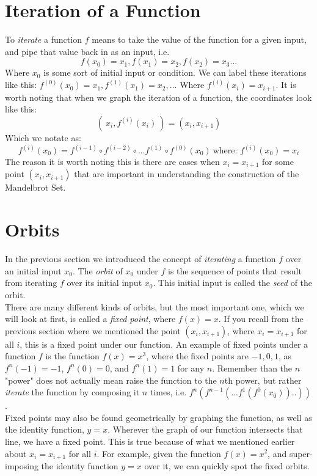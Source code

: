\documentclass[20pt]{article} %
\begin{document}
\section{Iteration of a Function}
To \textit{iterate} a function $f$ means to take the value of the function for a given input, and pipe that value back in as an input, i.e. 
$$ f(x_0)=x_1, f(x_1)=x_2, f(x_2)=x_3 ...$$
Where $x_0$ is some sort of initial input or condition.  We can label these iterations like this: $f^{(0)}(x_0)=x_1, f^{(1)}(x_1)=x_2, ...$ Where $f^{(i)}(x_i)=x_{i+1}$.  It is worth noting that when we graph the iteration of a function, the coordinates look like this: 
$$( \ x_i, f^{(i)}(x_i)\ ) = (x_i, x_{i+1})$$ 
Which we notate as:
$$ f^{(i)}(x_0) = f^{(i-1)} \circ f^{(i-2)} \circ ... f^{(1)} \circ f^{(0)}(x_0) \ \text{where: } f^{(i)}(x_0) = x_i$$
The reason it is worth noting this is there are cases when $x_i = x_{i+1}$ for some point $(x_i, x_{i+1})$ that are important in understanding the construction of the Mandelbrot Set.

\section{Orbits}
In the previous section we introduced the concept of \textit{iterating} a function $f$ over an initial input $x_0$.  The \textit{orbit} of $x_0$ under $f$ is the sequence of points that result from iterating $f$ over its initial input $x_0$.  This initial input is called the \textit{seed} of the orbit. \\

There are many different kinds of orbits, but the most important one, which we will look at first, is called a \textit{fixed point}, where $f(x) = x$.  If you recall from the previous section where we mentioned the point $(x_i, x_{i+1})$, where $x_i = x_{i+1}$ for all $i$, this is a fixed point under our function. An example of fixed points under a function $f$ is the function $f(x) = x^{3}$, where the fixed points are $-1, 0, 1$, as$ f^{n}(-1)=-1$, $f^{n}(0)=0$, and $f^{n}(1)=1$ for any $n$. Remember than the $n$ "power" does not actually mean raise the function to the $n$th power, but rather \textit{iterate} the function by composing it $n$ times, i.e. $f^{n}(f^{n-1}(...f^{1}(f^{0}(x_0))..))$. \\

Fixed points may also be found geometrically by graphing the function, as well as the identity function, $y=x$.  Wherever the graph of our function intersects that line, we have a fixed point.  This is true because of what we mentioned earlier about $x_i = x_{i+1}$ for all $i$.  For example, given the function $f(x) = x^{2}$, and super-imposing the identity function $y=x$ over it, we can quickly spot the fixed orbits.
\end{document}
